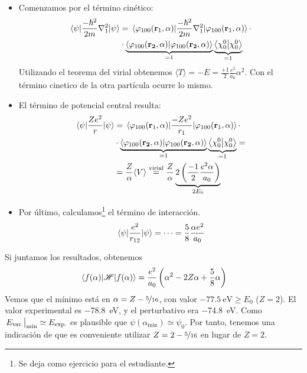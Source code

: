 \begin{itemize}
\item Comenzamos por el término cinético:
  \begin{equation}
    \begin{split}
      \ev{\frac{-\hbar^2}{2m}\nabla_1^2}{\psi} &=
      \ev{\frac{-\hbar^2}{2m}\nabla_1^2}{\varphi_{100}(\boldrm{r}_1,\alpha)}
      \cdot \\ &\cdot \underbrace{\ip{\varphi_{100}(\boldrm{r_2},\alpha)}}_{=1}
      \underbrace{\ip{\chi_0^0}}_{=1}
    \end{split}
  \end{equation}
  Utilizando el teorema del virial obtenemos $\langle T \rangle = -E =
  \frac{+1}{2} \frac{e^2}{a_0} \alpha^2$. Con el término cinetico de
  la otra partícula ocurre lo mismo.
\item El término de potencial central resulta:
  \begin{equation}
    \begin{split}
      \ev{\frac{Ze^2}{r}}{\psi} &=
      \ev{\frac{-Ze^2}{r_1}}{\varphi_{100}(\boldrm{r}_1,\alpha)} \cdot \\
      &\cdot \underbrace{\ip{\varphi_{100}(\boldrm{r_2},\alpha)}}_{=1}
      \underbrace{\ip{\chi_0^0}}_{=1} = \\
      &= \frac{Z}{\alpha} \langle V \rangle
      \stackrel{\text{virial}}{=} \frac{Z}{\alpha} \underbrace{2 \left( \frac{-1}{2}\frac{e^2\alpha}{a_0} \right)}_{2E_0}
    \end{split}
  \end{equation}
\item Por último, calculamos\footnote{Se deja como ejercicio para el
    estudiante.} el término de interacción.
\begin{equation}
  \ev{\frac{e^2}{r_{12}}}{\psi} = \cdots = \frac{5}{8} \frac{\alpha e^2}{a_0}
\end{equation}
\end{itemize}

Si juntamos los resultados, obtenemos
\begin{equation}
  \ev{ \Ham }{f(\alpha)} = \frac{e^2}{a_0} \left(\alpha^2 -2Z\alpha +
    \frac{5}{8}\alpha \right)
\end{equation}
Vemos que el mínimo está en $\alpha = Z - \nicefrac{5}{16}$, con valor
$\SI{-77.5}{\eV} \geq E_0$ ($Z=2$). El valor experimental es
\SI{-78.8}{\eV}, y el perturbativo era \SI{-74.8}{\eV}. Como
$\eval{E_\text{var.}}_\text{min} \simeq E_\text{exp.}$ es plausible que
$\psi(\alpha_\text{min}) \simeq \psi_0$. Por tanto, tenemos una
indicación de que es conveniente utilizar $Z=2-\nicefrac{5}{16}$ en
lugar de $Z=2$.

